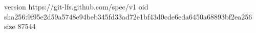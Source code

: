 version https://git-lfs.github.com/spec/v1
oid sha256:9f95e2d59a5748e94beb345fd33ad72e1bf43d0cde6eda6450a68893bf2ea256
size 87544
